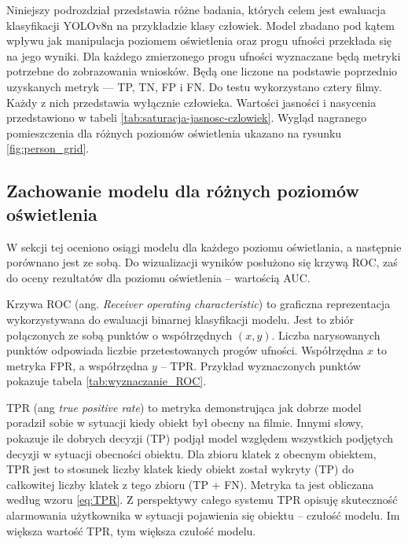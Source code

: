 Niniejszy podrozdział przedstawia różne badania, których celem jest ewaluacja klasyfikacji YOLOv8n na przykładzie klasy człowiek. Model zbadano pod kątem wpływu jak manipulacja poziomem oświetlenia oraz progu ufności przekłada się na jego wyniki. Dla każdego zmierzonego progu ufności wyznaczane będą metryki potrzebne do zobrazowania wniosków. Będą one liczone na podstawie poprzednio uzyskanych metryk --- TP, TN, FP i FN. Do testu wykorzystano cztery filmy. Każdy z nich przedstawia wyłącznie człowieka. Wartości jasności i nasycenia przedstawiono w tabeli \ref{tab:saturacja-jasnosc-czlowiek}. Wygląd nagranego pomieszczenia dla różnych poziomów oświetlenia ukazano na rysunku \ref{fig:person_grid}. 









\subsection{Zachowanie modelu dla różnych poziomów oświetlenia}
\label{sec:test-AUC}
W sekcji tej oceniono osiągi modelu dla każdego poziomu oświetlania, a następnie porównano jest ze sobą. Do wizualizacji wyników posłużono się krzywą ROC, zaś do oceny rezultatów dla poziomu oświetlenia -- wartością AUC.

Krzywa ROC (ang. \emph{Receiver operating characteristic}) to graficzna reprezentacja wykorzystywana do ewaluacji binarnej klasyfikacji modelu. Jest to zbiór połączonych ze sobą punktów o współrzędnych $(x, y)$. Liczba narysowanych punktów odpowiada liczbie przetestowanych progów ufności. Współrzędna $x$ to metryka FPR, a współrzędna $y$ -- TPR. Przykład wyznaczonych punktów pokazuje tabela \ref{tab:wyznaczanie_ROC}. 


TPR (ang \emph{true positive rate}) to metryka demonstrująca jak dobrze model poradził sobie w sytuacji kiedy obiekt był obecny na filmie. Innymi słowy, pokazuje ile dobrych decyzji (TP) podjął model względem wszystkich podjętych decyzji w sytuacji obecności obiektu. Dla zbioru klatek z obecnym obiektem, TPR jest to stosunek liczby klatek kiedy obiekt został wykryty (TP) do całkowitej liczby klatek z tego zbioru (TP + FN). Metryka ta jest obliczana według wzoru \ref{eq:TPR}. Z perspektywy całego systemu TPR opisuję skuteczność alarmowania użytkownika w sytuacji pojawienia się obiektu -- czułość modelu. Im większa wartość TPR, tym większa czułość modelu.


